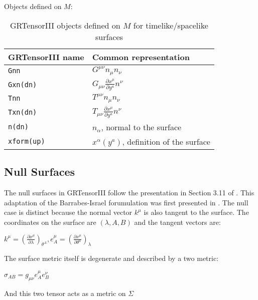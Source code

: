 \documentclass{article}
\begin{document}
Objects defined on $M$:
\begin{table}[h]
  \begin{center}
    \begin{tabular}{ll}\hline\hline
      \textbf{GRTensorIII name} & \textbf{Common representation}\\ \hline
      \texttt{Gnn}        & $G^{\mu \nu} n_\mu n_\nu $  \\
      \texttt{Gxn(dn)}        & $G_{\mu \nu} \frac{\partial x^\mu}{\partial y^a} n^\nu $  \\
      \texttt{Tnn}        & $T^{\mu \nu} n_\mu n_\nu $  \\
      \texttt{Txn(dn)}        & $T_{\mu \nu} \frac{\partial x^\mu}{\partial y^a} n^\nu $  \\
      \texttt{n(dn) }      & $n_\alpha$, normal to the surface   \\    
      \texttt{xform(up)}        & $x^\alpha(y^a)$, definition of the surface  \\    
    \end{tabular}
    \caption{GRTensorIII objects defined on $M$ for timelike/spacelike surfaces}
    \label{tab:ts2}
  \end{center}
\end{table}


\subsection{Null Surfaces}
The null surfaces in GRTensorIII follow the presentation in Section 3.11 of \cite{poisson:2004}. This adaptation of the 
Barrabes-Israel forumulation \cite{bi} was first presented in \cite{poisson:2002}. The null case is distinct because the 
normal vector $k^\mu$ is also tangent to the surface. The coordinates on the surface are $(\lambda, A, B)$ and the 
tangent vectors are:
\begin{center}
$k^\mu = \left( \frac{\partial x^\mu}{\partial \lambda} \right)_{\theta^A}, 
e^\mu_A = \left( \frac{\partial x^\mu}{\partial \theta^a} \right)_{\lambda}$
\end{center}

The surface metric itself is degenerate and described by a two metric:
\begin{center}
$\sigma_{AB} = g_{\mu \nu} e^\mu_A e^\nu_B$
\end{center}
And this two tensor acts as a metric on $\Sigma$
\end{document}
